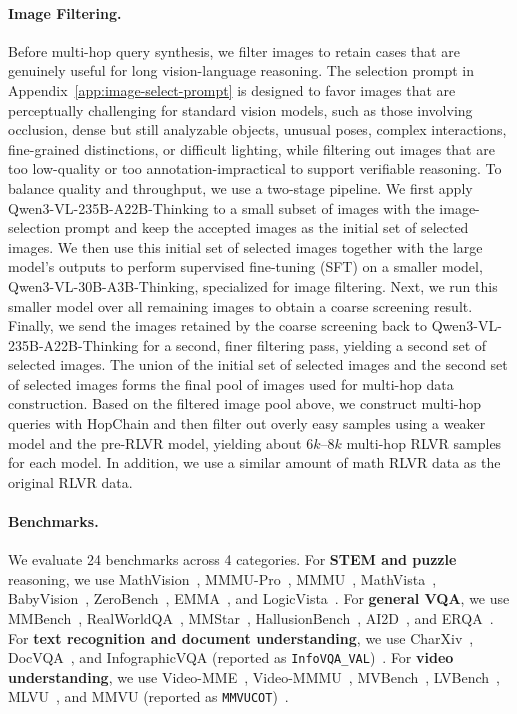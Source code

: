 \paragraph{Image Filtering.}
Before multi-hop query synthesis, we filter images to retain cases that are genuinely useful for long vision-language reasoning.
The selection prompt in Appendix~\ref{app:image-select-prompt} is designed to favor images that are perceptually challenging for standard vision models, such as those involving occlusion, dense but still analyzable objects, unusual poses, complex interactions, fine-grained distinctions, or difficult lighting, while filtering out images that are too low-quality or too annotation-impractical to support verifiable reasoning.
To balance quality and throughput, we use a two-stage pipeline.
We first apply Qwen3-VL-235B-A22B-Thinking to a small subset of images with the image-selection prompt and keep the accepted images as the initial set of selected images.
We then use this initial set of selected images together with the large model's outputs to perform supervised fine-tuning (SFT) on a smaller model, Qwen3-VL-30B-A3B-Thinking, specialized for image filtering.
Next, we run this smaller model over all remaining images to obtain a coarse screening result.
Finally, we send the images retained by the coarse screening back to Qwen3-VL-235B-A22B-Thinking for a second, finer filtering pass, yielding a second set of selected images.
The union of the initial set of selected images and the second set of selected images forms the final pool of images used for multi-hop data construction.
Based on the filtered image pool above, we construct multi-hop queries with HopChain and then filter out overly easy samples using a weaker model and the pre-RLVR model, yielding about $6k$--$8k$ multi-hop RLVR samples for each model.
In addition, we use a similar amount of math RLVR data as the original RLVR data.

\paragraph{Benchmarks.}
We evaluate 24 benchmarks across 4 categories.
For \textbf{STEM and puzzle} reasoning, we use MathVision~, MMMU-Pro~, MMMU~, MathVista~, BabyVision~, ZeroBench~, EMMA~, and LogicVista~.
For \textbf{general VQA}, we use MMBench~, RealWorldQA~, MMStar~, HallusionBench~, AI2D~, and ERQA~.
For \textbf{text recognition and document understanding}, we use CharXiv~, DocVQA~, and InfographicVQA (reported as \texttt{InfoVQA\_VAL})~.
For \textbf{video understanding}, we use Video-MME~, Video-MMMU~, MVBench~, LVBench~, MLVU~, and MMVU (reported as \texttt{MMVUCOT})~.

